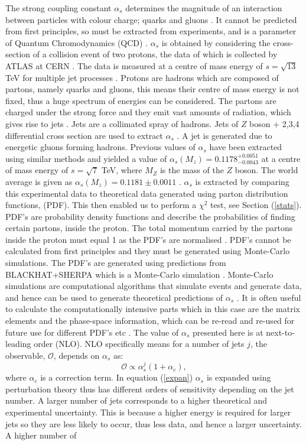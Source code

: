\documentclass[12pt, onecolumn]{revtex4}    %
\begin{document}
The strong coupling constant ${\alpha _s}$ determines the magnitude of an interaction between particles with colour charge; quarks and gluons \cite{PPB}. It cannot be predicted from first principles, so must be extracted from experiments, and is a parameter of Quantum Chromodynamics (QCD) \cite{DMP}.  ${\alpha _s}$ is obtained by considering the cross-section of a collision event of two protons, the data of which is collected by ATLAS at CERN \cite{HEPD}. The data is measured at a centre of mass  energy of ${s = \sqrt{13}}$ TeV for multiple jet processes \cite{HEPP}.  Protons are hadrons which are composed of partons, namely quarks and gluons, this means their centre of mass energy is not fixed, thus a huge spectrum of energies can be considered. The partons are charged under the strong force and they emit vast amounts of radiation, which gives rise to jets \cite{PHD}. Jets are a collimated spray of hadrons. Jets of ${Z}$ boson + 2,3,4 differential cross section are used to extract ${\alpha _s}$ \cite{HEPP}. A jet is generated due to energetic gluons forming hadrons. Previous values of ${\alpha _s}$ have been extracted using similar methods and yielded a value of ${\alpha _s(M_z) = 0.1178^{+0.0051}_{-0.0043}}$ at a centre of mass energy of ${s=\sqrt{7}}$  TeV, where ${M_Z}$ is the mass of the ${Z}$ boson. The world average is given as ${\alpha _s(M_z) = 0.1181 \pm 0.0011}$ \cite{PPB}. ${\alpha _s}$ is extracted by comparing this experimental data to theoretical data generated using parton distribution functions, (PDF). This then enabled us to perform a ${\chi^2}$ test, see Section (\ref{stats}). PDF's are probability density functions and describe the probabilities of finding certain partons, inside the proton. The total momentum carried by the partons inside the proton must equal 1 as the PDF's are normalised \cite{BOOK}. PDF's cannot be calculated from first principles and they must be generated using Monte-Carlo simulations. The PDF's are generated using predictions from BLACKHAT+SHERPA which is a Monte-Carlo simulation \cite{BLACK}. Monte-Carlo simulations are computational algorithms that simulate events and generate data, and hence can be used to generate theoretical predictions of ${\alpha _s}$ \cite{MONTE}. It is often useful to calculate the computationally intensive parts which in this case are the matrix elements and the phase-space information, which can be re-read and re-used for future use for different PDF's etc \cite{BLACK}. The value of ${\alpha _s}$ presented here is at next-to-leading order (NLO). NLO specifically means for a number of jets $j$, the observable, ${\mathcal{O}}$, depends on ${\alpha _s}$ as: \begin{equation} \label{expan} \mathcal{O} \propto \alpha _s^j (1 + \alpha_c), \end{equation} where ${\alpha _c}$ is a correction term. In equation (\ref{expan}) ${\alpha _s}$ is expanded using perturbation theory thus has different orders of sensitivity depending on the jet number. A larger number of jets corresponds to a higher theoretical and experimental uncertainty. This is because a higher energy is required for larger jets so they are less likely to occur, thus less data, and hence a larger uncertainty. A higher number of 
\end{document}
